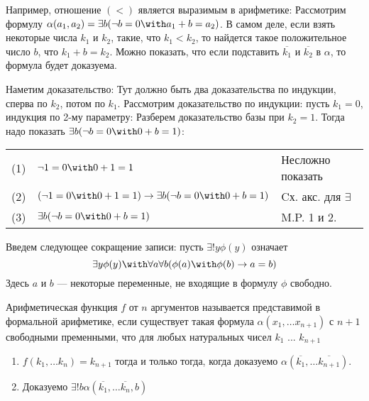 Например, отношение $(<)$ является выразимым в арифметике:
Рассмотрим формулу $\alpha (a_1, a_2) = \exists b (\neg b = 0 \with a_1 + b = a_2)$.
В самом деле, если взять некоторые числа $k_1$ и $k_2$, такие, что $k_1 < k_2$, то найдется
такое положительное число $b$, что $k_1 + b = k_2$. Можно показать, что если подставить
$\overline{k_1}$ и $\overline{k_2}$ в $\alpha$, то формула будет доказуема. 

Наметим доказательство:
Тут должно быть два доказательства по индукции, сперва по $k_2$, потом по $k_1$.
Рассмотрим доказательство по индукции: пусть $k_1 = 0$, индукция по 2-му параметру:
Разберем доказательство базы при $k_2 = 1$. Тогда надо показать $\exists b (\neg b = 0 \with 0 + b = 1)$:

\begin{tabular}{lll}
(1) & $\neg 1 = 0 \with 0 + 1 = 1$ & Несложно показать\\
(2) & $(\neg 1 = 0 \with 0 + 1 = 1) \rightarrow \exists b (\neg b = 0 \with 0 + b = 1)$ & Cх. акс. для $\exists$\\
(3) & $\exists b (\neg b = 0 \with 0 + b = 1)$ & M.P. 1 и 2.
\end{tabular}

\begin{definition} Введем следующее сокращение записи:
пусть $\exists ! y \phi (y)$ означает $$\exists y \phi (y) \with \forall a \forall b (\phi(a) \with \phi(b) \rightarrow a=b)$$
Здесь $a$ и $b$ --- некоторые переменные, не входящие в формулу $\phi$ свободно.
\end{definition}

\begin{definition} Арифметическая функция $f$ от $n$ аргументов называется представимой в 
формальной арифметике, если существует такая формула $\alpha (x_1, \dots x_{n+1})$ с $n+1$ 
свободными пременными, что для любых натуральных чисел $k_1$ ... $k_{n+1}$
\begin{enumerate}
\item $f(k_1, \dots k_n) = k_{n+1}$ тогда и только тогда, когда доказуемо 
$\alpha (\overline{k_1}, \dots \overline{k_{n+1}})$.
\item Доказуемо $\exists ! b \alpha (\overline{k_1}, \dots \overline{k_n}, b)$
\end{enumerate}
\end{definition} 


